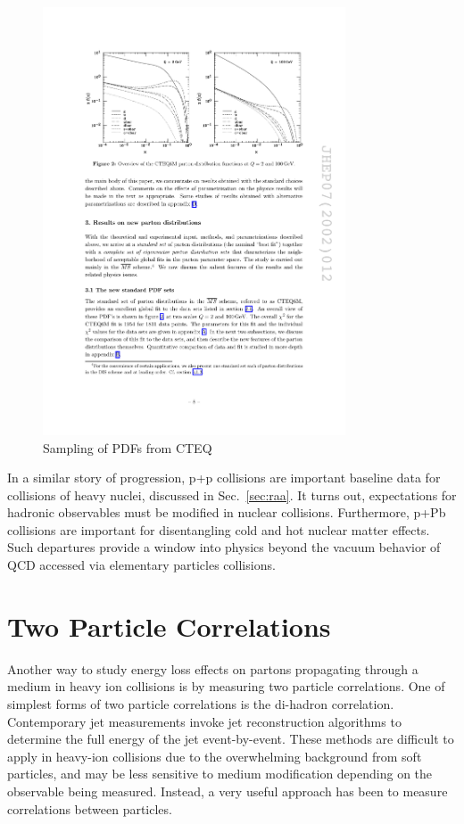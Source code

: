   \begin{figure}[htpb]
    \centering
    \includegraphics[width=0.8\textwidth]{Introduction/pdfs.pdf}
    \caption{Sampling of PDFs from CTEQ \cite{Pumplin2002}}
    \label{fig:dis_pdfs}
  \end{figure}

In a similar story of progression, p+p collisions are important baseline data for collisions of heavy nuclei, discussed in Sec.~\ref{sec:raa}. It turns out, expectations for hadronic observables must be modified in nuclear collisions. Furthermore, p+Pb collisions are important for disentangling cold and hot nuclear matter effects. Such departures provide a window into physics beyond the vacuum behavior of QCD accessed via elementary particles collisions. 




\section{Two Particle Correlations}
Another way to study energy loss effects on partons propagating through a medium in heavy ion collisions is by measuring two particle correlations. One of simplest forms of two particle correlations is the di-hadron correlation. Contemporary jet measurements invoke jet reconstruction algorithms to determine the full energy of the jet event-by-event. These methods are difficult to apply in heavy-ion collisions due to the overwhelming background from soft particles, and may be less sensitive to medium modification depending on the observable being measured. Instead, a very useful approach has been to measure correlations between particles.

